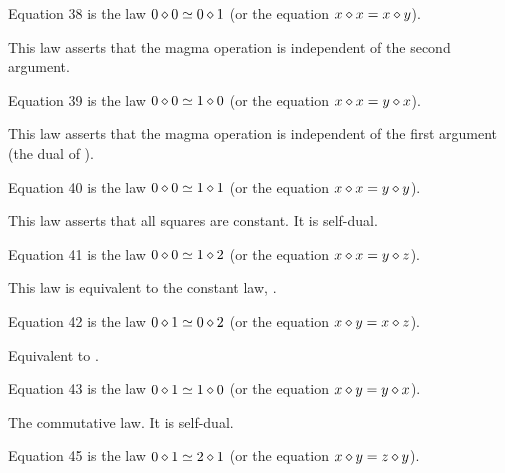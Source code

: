 \begin{definition}[Equation 38]\label{eq38}\leanok{}  Equation 38 is the law $0 \diamond 0  \simeq  0 \diamond 1$ (or the equation $x \diamond x = x \diamond y$).
\end{definition}

This law asserts that the magma operation is independent of the second argument.

\begin{definition}[Equation 39]\label{eq39}\leanok{}  Equation 39 is the law $0 \diamond 0  \simeq  1 \diamond 0$ (or the equation $x \diamond x = y \diamond x$).
\end{definition}

This law asserts that the magma operation is independent of the first argument (the dual of ).

\begin{definition}[Equation 40]\label{eq40}\leanok{}  Equation 40 is the law $0 \diamond 0  \simeq  1 \diamond 1$ (or the equation $x \diamond x = y \diamond y$).
\end{definition}

This law asserts that all squares are constant. It is self-dual.

\begin{definition}[Equation 41]\label{eq41}\leanok{}  Equation 41 is the law $0 \diamond 0  \simeq  1 \diamond 2$ (or the equation $x \diamond x = y \diamond z$).
\end{definition}

This law is equivalent to the constant law, .

\begin{definition}[Equation 42]\label{eq42}\leanok{}  Equation 42 is the law $0 \diamond 1  \simeq  0 \diamond 2$ (or the equation $x \diamond y = x \diamond z$).
\end{definition}

Equivalent to .

\begin{definition}[Equation 43]\label{eq43}\leanok{}  Equation 43 is the law $0 \diamond 1  \simeq  1 \diamond 0$ (or the equation $x \diamond y = y \diamond x$).
\end{definition}

The commutative law. It is self-dual.

\begin{definition}[Equation 45]\label{eq45}\leanok{}  Equation 45 is the law $0 \diamond 1  \simeq  2 \diamond 1$ (or the equation $x \diamond y = z \diamond y$).
\end{definition}

